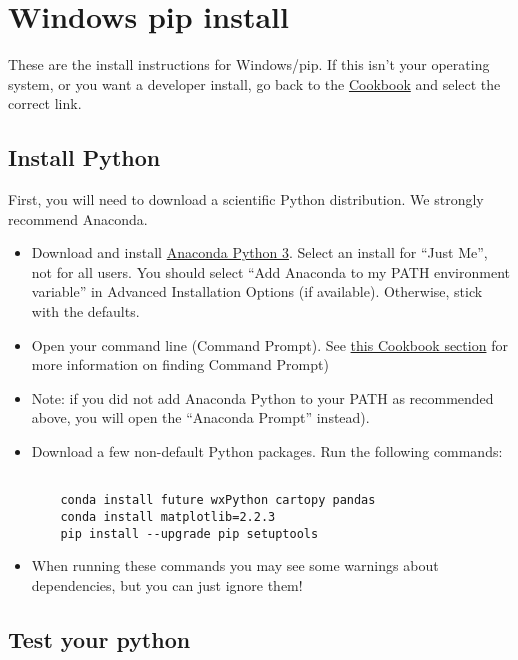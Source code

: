\documentclass[11pt]{article}
\begin{document}
\tableofcontents

\section{Windows pip install}

These are the install instructions for Windows/pip.  If this isn't your operating system, or you want a developer install, go back to the \href{https://earthref.org/PmagPy/cookbook/#next_steps}{Cookbook} and select the correct link.


\subsection{Install Python}
First, you will need to download a scientific Python distribution.  We strongly recommend Anaconda.

   \begin{itemize}
   \item Download and install \href{https://www.anaconda.com/download}{Anaconda Python 3}.  Select an install for “Just Me”, not for all users.  You should select ``Add Anaconda to my PATH environment variable'' in Advanced Installation Options (if available).  Otherwise, stick with the defaults.
   \item Open your command line (Command Prompt).  See \href{https://earthref.org/PmagPy/cookbook/#command_line}{this Cookbook section} for more information on finding Command Prompt)
   \item Note: if you did not add Anaconda Python to your PATH as recommended above, you will open the ``Anaconda Prompt'' instead).
   \item Download a few non-default Python packages.  Run the following commands: \begin{verbatim}

    conda install future wxPython cartopy pandas
    conda install matplotlib=2.2.3
    pip install --upgrade pip setuptools
\end{verbatim}
   \item When running these commands you may see some warnings about dependencies, but you can just ignore them!

\end{itemize}


\subsection{Test your python}
\end{document}
